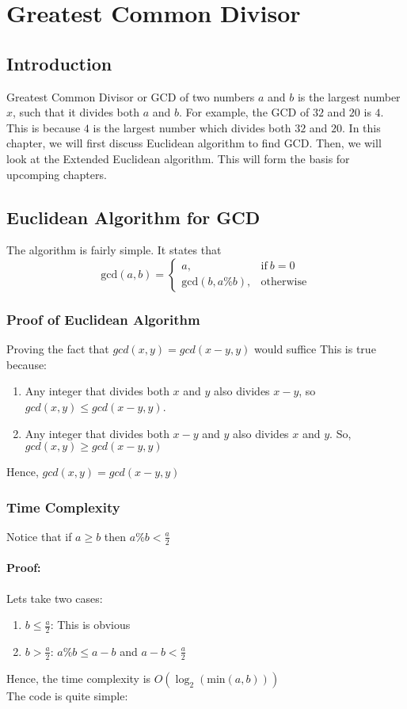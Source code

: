 \chapter{Greatest Common Divisor}

\section{Introduction}
Greatest Common Divisor or GCD of two numbers $a$ and $b$ is the largest number $x$, such that it divides both $a$ and $b$. For example, the GCD of $32$ and $20$ is $4$. This is because $4$ is the largest number which divides both $32$ and $20$. In this chapter, we will first discuss Euclidean algorithm to find GCD. Then, we will look at the Extended Euclidean algorithm. This will form the basis for upcomping chapters.

\section{Euclidean Algorithm for GCD}
The algorithm is fairly simple. It states that
\begin{equation}
    \text{gcd}(a,b)=
    \begin{cases}
      a, & \text{if}\ b=0 \\
      \text{gcd}(b,a\%b), & \text{otherwise}
    \end{cases}
\end{equation}

\subsection{Proof of Euclidean Algorithm}
Proving the fact that $gcd(x,y) = gcd(x-y,y)$ would suffice
  This is true because:

\begin{enumerate}
   \item Any integer that divides both $x$ and $y$ also divides $x-y$, so $gcd(x,y) \le gcd(x-y,y)$.  
   \item Any integer that divides both $x-y$ and $y$ also divides $x$ and $y$. So, $gcd(x,y) \ge gcd(x-y,y)$
\end{enumerate}
Hence, $gcd(x,y) = gcd(x-y,y)$
\subsection{Time Complexity}
Notice that if $a \ge b$ then $a\%b < \frac{a}{2}$
\subsubsection{Proof:}
Lets take two cases:\\
\begin{enumerate}
  \item $b \le \frac{a}{2}$: This is obvious
  \item $b > \frac{a}{2}$: $a\%b \le a-b$ and $a-b < \frac{a}{2}$ 
\end{enumerate}
Hence, the time complexity is $O(\log_2(\text{min} (a,b)))$\\
The code is quite simple:

